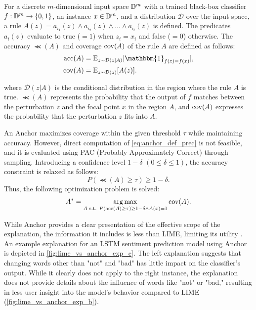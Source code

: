 \documentclass[runningheads]{llncs}
\begin{document}
For a discrete $m$-dimensional input space $\mathbb{D}^{m}$ with a trained black-box classifier $f: \mathbb{D}^{m} \to \{0,1\}$, an instance $x \in \mathbb{D}^{m}$, and a distribution $\mathcal{D}$ over the input space, a rule $A(z) = a_{i_1}(z) \wedge a_{i_2}(z) \wedge \dots \wedge a_{i_t}(z)$ is defined.
The predicates $a_i(z)$ evaluate to true ($=1$) when $z_i = x_i$ and false ($=0$) otherwise.
The accuracy $\Prec(A)$ and coverage $\operatorname{cov}(A)$ of the rule $A$ are defined as follows:
\begin{align}
  \Prec(A) & =\mathbb{E}_{z\sim\mathcal{D}(z|A)}
  [\mathbbm{1}_{f(z)=f(x)}], \label{eq:anchor_def_prec} \\
  \Cov(A)  & =\mathbb{E}_{z\sim\mathcal{D}(z)}[A(z)].
\end{align}

where $\mathcal{D}(z|A)$ is the conditional distribution in the region where the rule $A$ is true.
$\Prec(A)$ represents the probability that the output of $f$ matches between the perturbation $z$ and the focal point $x$ in the region $A$, and $\operatorname{cov}(A)$ expresses the probability that the perturbation $z$ fits into $A$.

An Anchor maximizes coverage within the given threshold $\tau$ while maintaining accuracy.
However, direct computation of \cref{eq:anchor_def_prec} is not feasible, and it is evaluated using PAC (Probably Approximately Correct) through sampling.
Introducing a confidence level $1-\delta$ $(0\le\delta\le1)$, the accuracy constraint is relaxed as follows:
\begin{equation}
  \label{eq:const_prec}
  P(\Prec(A)\ge\tau)\ge1-\delta.
\end{equation}
Thus, the following optimization problem is solved:
\begin{equation}
  \label{eq:main_problem}
  A^*=\underset{A \text{~s.t. } P(\operatorname{acc}(A)\ge\tau)\ge1-\delta\wedge A(x)=1}
  {\arg\max}\operatorname{cov}(A).
\end{equation}

While Anchor provides a clear presentation of the effective scope of the explanation, the information it includes is less than LIME, limiting its utility \cite{ribeiro2018anchors}. An example explanation for an LSTM sentiment prediction model using Anchor is depicted in \cref{fig:lime_vs_anchor_exp_c}. The left explanation suggests that changing words other than "not" and "bad" has little impact on the classifier's output. While it clearly does not apply to the right instance, the explanation does not provide details about the influence of words like "not" or "bad," resulting in less user insight into the model's behavior compared to LIME (\cref{fig:lime_vs_anchor_exp_b}).
\end{document}
